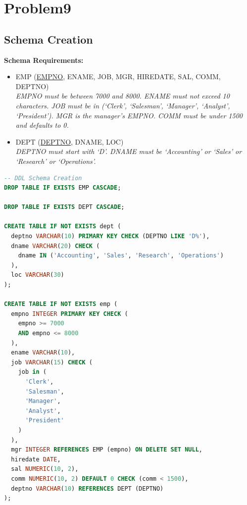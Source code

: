 \documentclass[11pt, a4paper]{article}
\begin{document}
\section{Problem9}

\subsection*{Schema Creation}
\textbf{Schema Requirements:}
\begin{itemize}
    \item EMP (\underline{EMPNO}, ENAME, JOB, MGR, HIREDATE, SAL, COMM, DEPTNO) \\
    \textit{EMPNO must be between 7000 and 8000. ENAME must not exceed 10 characters. JOB must be in (`Clerk', `Salesman', `Manager', `Analyst', `President'). MGR is the manager's EMPNO. COMM must be under 1500 and defaults to 0.}
    \item DEPT (\underline{DEPTNO}, DNAME, LOC) \\
    \textit{DEPTNO must start with `D'. DNAME must be `Accounting' or `Sales' or `Research' or `Operations'.}
\end{itemize}

\begin{lstlisting}[language=SQL]
-- DDL Schema Creation
DROP TABLE IF EXISTS EMP CASCADE;

DROP TABLE IF EXISTS DEPT CASCADE;

CREATE TABLE IF NOT EXISTS dept (
  deptno VARCHAR(10) PRIMARY KEY CHECK (DEPTNO LIKE 'D%'),
  dname VARCHAR(20) CHECK (
    dname IN ('Accounting', 'Sales', 'Research', 'Operations')
  ),
  loc VARCHAR(30)
);

CREATE TABLE IF NOT EXISTS emp (
  empno INTEGER PRIMARY KEY CHECK (
    empno >= 7000
    AND empno <= 8000
  ),
  ename VARCHAR(10),
  job VARCHAR(15) CHECK (
    job in (
      'Clerk',
      'Salesman',
      'Manager',
      'Analyst',
      'President'
    )
  ),
  mgr INTEGER REFERENCES EMP (empno) ON DELETE SET NULL,
  hiredate DATE,
  sal NUMERIC(10, 2),
  comm NUMERIC(10, 2) DEFAULT 0 CHECK (comm < 1500),
  deptno VARCHAR(10) REFERENCES DEPT (DEPTNO)
);
\end{lstlisting}
\newpage
\end{document}
